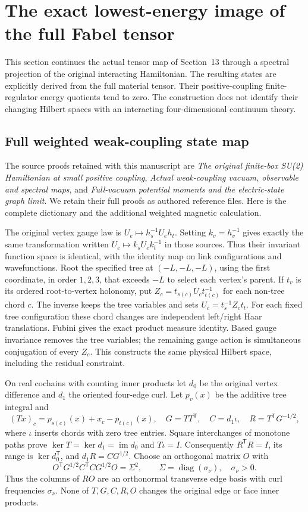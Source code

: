 \section{The exact lowest-energy image of the full Fabel tensor}
\label{sec:fabel-low}

This section continues the actual tensor map of Section~13 through a
spectral projection of the original interacting Hamiltonian. The resulting
states are explicitly derived from the full material tensor. Their
positive-coupling finite-regulator energy quotients tend to zero.
The construction does not identify their changing Hilbert spaces with an
interacting four-dimensional continuum theory.

\subsection{Full weighted weak-coupling state map}

The source proofs retained with this manuscript are \emph{The original
finite-box SU(2) Hamiltonian at small positive coupling},
\emph{Actual weak-coupling vacuum, observable and spectral maps}, and
\emph{Full-vacuum potential moments and the electric-state graph limit}.
We retain their full proofs as authored reference files. Here is the
complete dictionary and the additional weighted magnetic calculation.

The original vertex gauge law is $U_e\mapsto h_s^{-1}U_eh_t$. Setting
$k_v=h_v^{-1}$ gives exactly the same transformation written
$U_e\mapsto k_sU_ek_t^{-1}$ in those sources. Thus their invariant function
space is identical, with the identity map on link configurations and
wavefunctions. Root the specified tree at $(-L,-L,-L)$, using the first
coordinate, in order $1,2,3$, that exceeds $-L$ to select each vertex's
parent. If $t_v$ is its ordered root-to-vertex holonomy, put
$Z_c=t_{s(c)}U_ct_{t(c)}^{-1}$ for each non-tree chord $c$.
The inverse keeps the tree variables and sets $U_c=t_s^{-1}Z_ct_t$.
For each fixed tree configuration these chord changes are independent
left/right Haar translations. Fubini gives the exact product measure
identity. Based gauge invariance removes the tree variables; the
remaining gauge action is simultaneous conjugation of every $Z_c$.
This constructs the same physical Hilbert space, including the residual
constraint.

On real cochains with counting inner products let $d_0$ be the original
vertex difference and $d_1$ the oriented four-edge curl. Let $p_v(x)$
be the additive tree integral and
\[
 (Tx)_c=p_{s(c)}(x)+x_c-p_{t(c)}(x),\quad
 G=TT^{\mathsf T},\quad C=d_1\iota,\quad
 R=T^{\mathsf T}G^{-1/2},
\]
where $\iota$ inserts chords with zero tree entries.
Square interchanges of monotone paths prove
$\ker T=\ker d_1=\operatorname{im}d_0$ and $T\iota=I$.
Consequently $R^{\mathsf T}R=I$, its range is
$\ker d_0^{\mathsf T}$, and $d_1R=CG^{1/2}$.
Choose an orthogonal matrix $O$ with
\[
 O^{\mathsf T}G^{1/2}C^{\mathsf T}CG^{1/2}O=\Sigma^2,\qquad
 \Sigma=\operatorname{diag}(\sigma_\nu),\quad \sigma_\nu>0.
\]
Thus the columns of $RO$ are an orthonormal transverse edge basis
with curl frequencies $\sigma_\nu$. None of $T,G,C,R,O$ changes
the original edge or face inner products.

